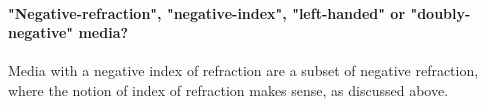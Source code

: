 
\cite{rockstuhl2008transition}
\cite{paul2011reflection}
\cite{andryieuski2012bloch}
\cite{andryieuski2010homogenization} 
\cite{simovski2007bloch}
\cite{simovski2009material}
\cite{simovski2011electromagnetic}
\cite{mortensen2010unambiguous}



\paragraph{"Negative-refraction", "negative-index", "left-handed" or "doubly-negative" media?}  %
Media with a negative index of refraction are a subset of negative refraction, where the notion of index of refraction makes sense, as discussed above.


